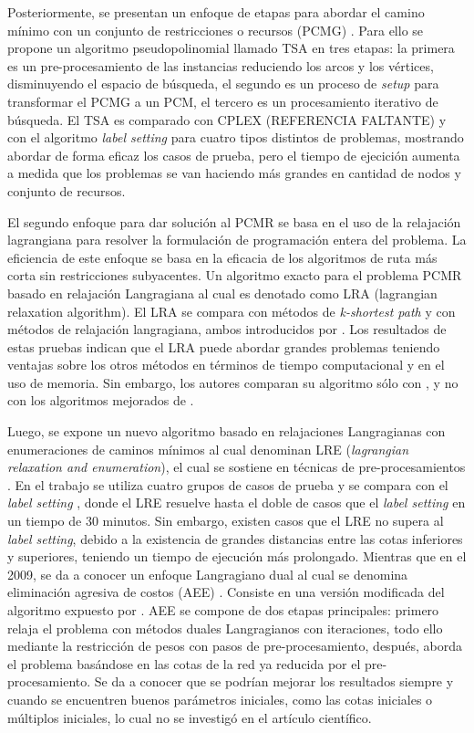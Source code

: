 Posteriormente, se presentan un enfoque de etapas para abordar el camino mínimo con un conjunto de restricciones o recursos (PCMG) \cite{zhu2012three}. Para ello se propone un algoritmo pseudopolinomial llamado TSA en tres etapas: la primera es un pre-procesamiento de las instancias reduciendo los arcos y los vértices, disminuyendo el espacio de búsqueda, el segundo es un proceso de \textit{setup} para transformar el PCMG a un PCM, el tercero es un procesamiento iterativo de búsqueda. El TSA es comparado con CPLEX (REFERENCIA FALTANTE) y con el algoritmo \textit{label setting} \citep{dumitrescu2003improved} para cuatro tipos distintos de problemas, mostrando abordar de forma eficaz los casos de prueba, pero el tiempo de ejecición aumenta a medida que los problemas se van haciendo más grandes en cantidad de nodos y conjunto de recursos.

El segundo enfoque para dar solución al PCMR se basa en el uso de la relajación lagrangiana para resolver la formulación de programación entera del problema. La eficiencia de este enfoque se basa en la eficacia de los algoritmos de ruta más corta sin restricciones subyacentes. Un algoritmo exacto para el problema PCMR basado en relajación Langragiana al cual es denotado como LRA (lagrangian relaxation algorithm)\citep{santos2007improved}. El LRA se compara con métodos de \textit{k-shortest path} y con métodos de relajación langragiana, ambos introducidos por \cite{handler1980dual}. Los resultados de estas pruebas indican que el LRA puede abordar grandes problemas teniendo ventajas sobre los otros métodos en términos de tiempo computacional y en el uso de memoria. Sin embargo, los autores comparan su algoritmo sólo con \cite{handler1980dual}, y no con los algoritmos mejorados de \citep{dumitrescu2003improved}.

Luego, se expone un nuevo algoritmo basado en relajaciones Langragianas con enumeraciones de caminos mínimos al cual denominan LRE (\textit{lagrangian relaxation and enumeration}), el cual se sostiene en técnicas de pre-procesamientos \citep{carlyle2008lagrangian}. En el trabajo se utiliza cuatro grupos de casos de prueba y se compara con el \textit{label setting} \citep{dumitrescu2003improved}, donde el LRE resuelve hasta el doble de casos que el \textit{label setting} en un tiempo de 30 minutos. Sin embargo, existen casos que el LRE no supera al \textit{label setting}, debido a la existencia de grandes distancias entre las cotas inferiores y superiores, teniendo un tiempo de ejecución más prolongado. Mientras que en el 2009, se da a conocer un enfoque Langragiano dual al cual se denomina eliminación agresiva de costos (AEE) \citep{muhandiramge2009simultaneous}. Consiste en una versión modificada del algoritmo expuesto por \citep{carlyle2008lagrangian}. AEE se compone de dos etapas principales: primero relaja el problema con métodos duales Langragianos con iteraciones, todo ello mediante la restricción de pesos con pasos de pre-procesamiento, después, aborda el problema basándose en las cotas de la red ya reducida por el pre-procesamiento. Se da a conocer que se podrían mejorar los resultados siempre y cuando se encuentren buenos parámetros iniciales, como las cotas iniciales o múltiplos iniciales, lo cual no se investigó en el artículo científico.

